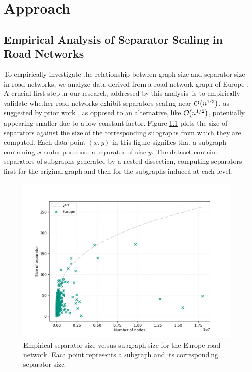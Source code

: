\chapter{Approach}
\label{ch:experimental_analysis}


\section{Empirical Analysis of Separator Scaling in Road Networks}
\label{sec:empirical_analysis}

To empirically investigate the relationship between graph size and separator size in road networks, we analyze data derived from a road network graph of Europe \cite{ptv_group_dimacs-europe_2009}.
A crucial first step in our research, addressed by this analysis, is to empirically validate whether road networks exhibit separators scaling near \(\mathcal{O}\!\left(n^{1/3}\right)\), as suggested by prior work \cite{dibbelt_customizable_2016}, as opposed to an alternative, like \(\mathcal{O}\!\left(n^{1/2}\right)\), potentially appearing smaller due to a low constant factor.
Figure \cref{fig:separator_size_vs_graph_size} plots the size of separators against the size of the corresponding subgraphs from which they are computed.
Each data point \( (x, y) \) in this figure signifies that a subgraph containing \( x \) nodes possesses a separator of size \( y \).
The dataset contains separators of subgraphs generated by a nested dissection, computing separators first for the original graph and then for the subgraphs induced at each level.

\begin{figure}[tbhp]
	\centering
	\includegraphics[width=0.7\linewidth]{graphics/Europe.png}
	\caption{Empirical separator size versus subgraph size for the Europe road network. Each point represents a subgraph and its corresponding separator size.}
	\label{fig:separator_size_vs_graph_size}
\end{figure}

